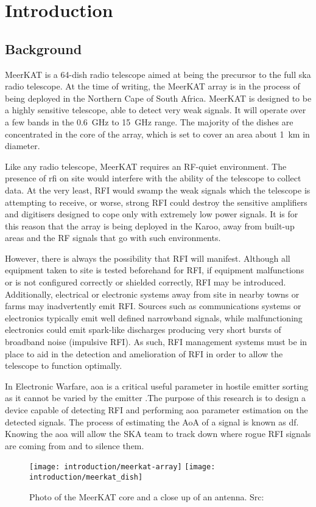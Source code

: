 \chapter{Introduction}
\label{ch:introduction}
\section{Background}
MeerKAT is a 64-dish radio telescope aimed at being the precursor to the full \gls{ska} radio telescope. At the time of writing, the MeerKAT array is in the process of being deployed in the Northern Cape of South Africa.
MeerKAT is designed to be a highly sensitive telescope, able to detect very weak signals. It will operate over a few bands in the \SI{0.6}{\giga\hertz} to \SI{15}{\giga\hertz} range. The majority of the dishes are concentrated in the core of the array, which is set to cover an area about \SI{1}{\kilo\meter} in diameter.

Like any radio telescope, MeerKAT requires an RF-quiet environment.
The presence of \gls{rfi} on site would interfere with the ability of the telescope to collect data. At the very least, RFI would swamp the weak signals which the telescope is attempting to receive, or  worse, strong RFI could destroy the sensitive amplifiers and digitisers designed to cope only with extremely low power signals.
It is for this reason that the array is being deployed in the Karoo, away from built-up areas and the RF signals that go with such environments.

However, there is always the possibility that RFI will manifest. 
Although all equipment taken to site is tested beforehand for RFI, if equipment malfunctions or is not configured correctly or shielded correctly, RFI may be introduced. Additionally, electrical or electronic systems away from site in nearby towns or farms may inadvertently emit RFI. 
Sources such as communications systems or electronics typically emit well defined narrowband signals, while malfunctioning electronics could emit spark-like discharges producing very short bursts of broadband noise (impulsive RFI).
As such, RFI management systems must be in place to aid in the detection and amelioration of RFI in order to allow the telescope to function optimally. 

In Electronic Warfare, \gls{aoa} is a critical useful parameter in hostile emitter sorting as it cannot be varied by the emitter \cite{center2012electronic}.The purpose of this research is to design a device capable of detecting RFI and performing \gls{aoa} parameter estimation on the detected signals.
The process of estimating the AoA of a signal is known as \gls{df}.
Knowing the \gls{aoa} will allow the SKA team to track down where rogue RFI signals are coming from and to silence them.

\begin{figure}[hb]
  \centering
  \texttt{[image: introduction/meerkat-array]}
  \texttt{[image: introduction/meerkat\_dish]}
  \caption{Photo of the MeerKAT core and a close up of an antenna. Src: \cite{skasawebsite}}
\end{figure}



